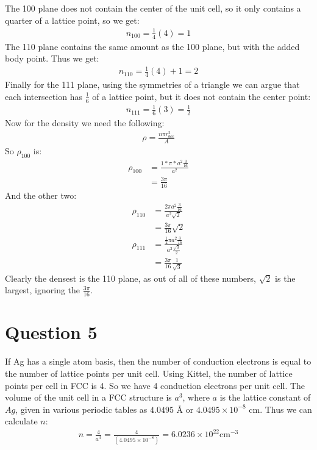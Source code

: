 \documentclass[12pt]{article}
\begin{document}
The 100 plane does not contain the center of the unit cell, so it only contains a quarter of a lattice point, so we get:
\begin{align*}
  n_{100}=\frac{1}{4}(4)=1
\end{align*}
The 110 plane contains the same amount as the 100 plane, but with the added body point. Thus we get:
\begin{align*}
  n_{110}=\frac{1}{4}(4)+1=2
\end{align*}
Finally for the 111 plane, using the symmetries of a triangle we can argue that each intersection has $\frac{1}{6}$ of a lattice point, but it does not contain the center point:
\begin{align*}
  n_{111}=\frac{1}{6}(3)=\frac{1}{2}
\end{align*}
Now for the density we need  the following:
\begin{align*}
  \rho=\frac{n\pi r_{bcc}^2}{A}
\end{align*}
So $\rho_{100}$ is:
\begin{align*}
  \rho_{100}&=\frac{1*\pi*a^2\frac{3}{16}}{a^2}\\
  &=\frac{3\pi}{16}
\end{align*}
And the other two:
\begin{align*}
  \rho_{110}&=\frac{2\pi a^2\frac{3}{16}}{a^2\sqrt{2}}\\
            &=\frac{3\pi}{16}\sqrt{2}\\
  \rho_{111}&=\frac{\frac{1}{2}\pi a^2\frac{3}{16}}{a^2\frac{\sqrt{3}}{2}}\\
            &=\frac{3\pi}{16}\frac{1}{\sqrt{3}}
\end{align*}
Clearly the densest is the 110 plane, as out of all of these numbers, $\sqrt{2}$ is the largest, ignoring the $\frac{3\pi}{16}$. 
\section*{Question 5}
If Ag has a single atom basis, then the number of conduction electrons is equal to the number of lattice points per unit cell. Using Kittel, the number of lattice points per cell in FCC is 4. So we have 4 conduction electrons per unit cell. The volume of the unit cell in a FCC structure is $a^3$, where $a$ is the lattice constant of $Ag$, given in various periodic tables as $4.0495$ \r{A} or $4.0495\times10^{-8}$ cm. Thus we can calculate $n$:
\begin{align*}
  n=\frac{4}{a^3}=\frac{4}{(4.0495\times10^{-8})}=
  \boxed{6.0236\times10^{22}\text{cm}^{-3}}
\end{align*}
\end{document}
